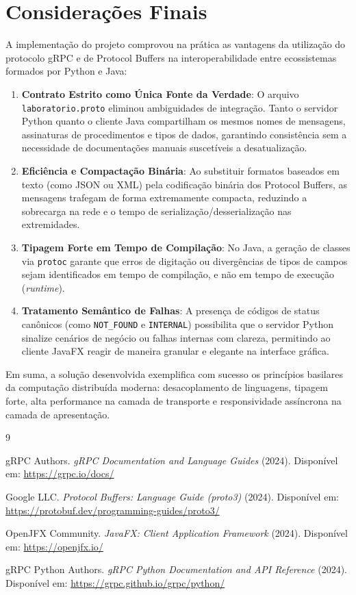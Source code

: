 \documentclass[12pt,a4paper]{article}
\begin{document}
\section{Considerações Finais}

A implementação do projeto comprovou na prática as vantagens da utilização do protocolo gRPC e de Protocol Buffers na interoperabilidade entre ecossistemas formados por Python e Java:

\begin{enumerate}
    \item \textbf{Contrato Estrito como Única Fonte da Verdade}: O arquivo \texttt{laboratorio.proto} eliminou ambiguidades de integração. Tanto o servidor Python quanto o cliente Java compartilham os mesmos nomes de mensagens, assinaturas de procedimentos e tipos de dados, garantindo consistência sem a necessidade de documentações manuais suscetíveis a desatualização.
    \item \textbf{Eficiência e Compactação Binária}: Ao substituir formatos baseados em texto (como JSON ou XML) pela codificação binária dos Protocol Buffers, as mensagens trafegam de forma extremamente compacta, reduzindo a sobrecarga na rede e o tempo de serialização/desserialização nas extremidades.
    \item \textbf{Tipagem Forte em Tempo de Compilação}: No Java, a geração de classes via \texttt{protoc} garante que erros de digitação ou divergências de tipos de campos sejam identificados em tempo de compilação, e não em tempo de execução (\textit{runtime}).
    \item \textbf{Tratamento Semântico de Falhas}: A presença de códigos de status canônicos (como \texttt{NOT\_FOUND} e \texttt{INTERNAL}) possibilita que o servidor Python sinalize cenários de negócio ou falhas internas com clareza, permitindo ao cliente JavaFX reagir de maneira granular e elegante na interface gráfica.
\end{enumerate}

Em suma, a solução desenvolvida exemplifica com sucesso os princípios basilares da computação distribuída moderna: desacoplamento de linguagens, tipagem forte, alta performance na camada de transporte e responsividade assíncrona na camada de apresentação.

\begin{thebibliography}{9}
\singlespacing

gRPC Authors. \textit{gRPC Documentation and Language Guides} (2024). Disponível em: \url{https://grpc.io/docs/}

Google LLC. \textit{Protocol Buffers: Language Guide (proto3)} (2024). Disponível em: \url{https://protobuf.dev/programming-guides/proto3/}

OpenJFX Community. \textit{JavaFX: Client Application Framework} (2024). Disponível em: \url{https://openjfx.io/}

gRPC Python Authors. \textit{gRPC Python Documentation and API Reference} (2024). Disponível em: \url{https://grpc.github.io/grpc/python/}

\end{thebibliography}
\end{document}
